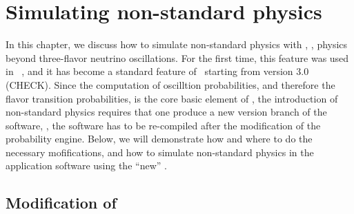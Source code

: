 \chapter{Simulating non-standard physics}
\label{chapt:nsphysics}

In this chapter, we discuss how to simulate non-standard physics with \GLOBES , \ie, physics
beyond three-flavor neutrino oscillations. For the first time, this feature was used in \Ref~\cite{Blennow:2005yk},
and it has become a standard feature of \GLOBES\ starting from version 3.0 (CHECK). Since the 
computation of oscilltion probabilities, and therefore the flavor transition probabilities, is the core basic
element of \GLOBES , the introduction of non-standard physics requires that one produce a new version branch
of the software, \ie, the software has to be re-compiled after the modification of the probability engine.
Below, we will demonstrate how and where to do the necessary mofifications, and how to simulate non-standard
physics in the application software using the ``new'' \GLOBES .

\section{Modification of \GLOBES }

